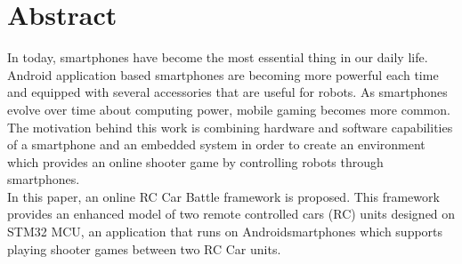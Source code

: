 \chapter*{Abstract}

In today, smartphones have become the most essential thing in our daily life. Android application based smartphones are becoming more powerful each time and equipped with several accessories that are useful for robots. As smartphones evolve over time about computing power, mobile gaming becomes more common. The motivation behind this work is combining hardware and software capabilities of a smartphone and an embedded system in order to create an environment which provides an online shooter game by controlling robots through smartphones.\\ 

In this paper, an online RC Car Battle framework is proposed. This framework provides an enhanced model of two remote controlled cars (RC) units designed on STM32 MCU, an application that runs on Android\texttrademark\;smartphones which supports playing shooter games between two RC Car units. 
\vfill
\clearpage